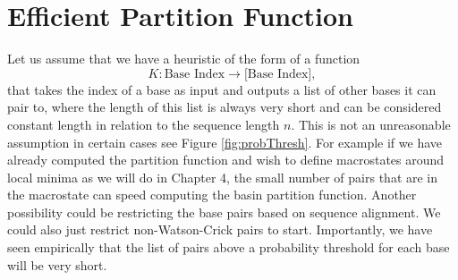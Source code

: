 \section{Efficient Partition Function}

Let us assume that we have a heuristic of the form of a function 
\begin{equation}
K : \text{Base Index} \to \text{[Base Index]},
\end{equation}
that takes the index of a base as input and outputs a list of other
bases it can pair to, where the length of this list is always very
short and can be considered constant length in relation to the
sequence length $n$. This is not an unreasonable assumption in certain
cases see Figure \ref{fig:probThresh}. For example if we have already
computed the partition function and wish to define macrostates around
local minima as we will do in Chapter 4, the small number of pairs
that are in the macrostate can speed computing the basin partition
function. Another possibility could be restricting the base pairs
based on sequence alignment. We could also just restrict
non-Watson-Crick pairs to start. Importantly, we have seen empirically
that the list of pairs above a probability threshold for each base will
be very short.

